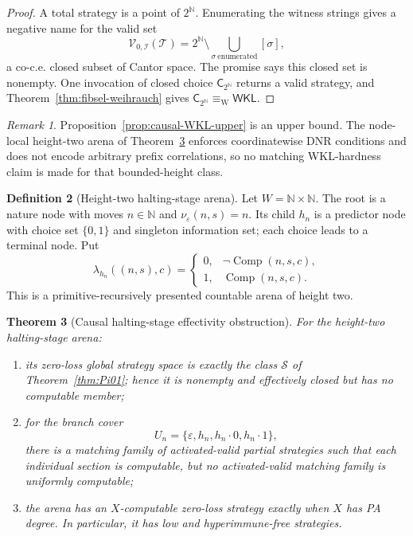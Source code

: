 \documentclass[11pt]{article}
\theoremstyle{plain}
\newtheorem{theorem}{Theorem}[section]
\theoremstyle{definition}
\newtheorem{definition}[theorem]{Definition}
\theoremstyle{remark}
\newtheorem{remark}[theorem]{Remark}
\newcommand{\N}{\mathbb{N}}
\begin{document}
\begin{proof}
A total strategy is a point of $2^\N$. Enumerating the witness strings gives a
negative name for the valid set
\[
\mathscr V_{0,\mathcal I}(\mathcal T)
=2^\N\setminus\bigcup_{\sigma\ \mathrm{enumerated}}[\sigma],
\]
a co-c.e. closed subset of Cantor space. The promise says this closed set is
nonempty. One invocation of closed choice $\mathsf C_{2^\N}$ returns a valid
strategy, and Theorem~\ref{thm:fibsel-weihrauch} gives
$\mathsf C_{2^\N}\equiv_{\mathrm W}\mathsf{WKL}$.
\end{proof}

\begin{remark}
Proposition~\ref{prop:causal-WKL-upper} is an upper bound. The node-local
height-two arena of Theorem~\ref{thm:K-arena} enforces coordinatewise DNR
conditions and does not encode arbitrary prefix correlations, so no matching
WKL-hardness claim is made for that bounded-height class.
\end{remark}

\begin{definition}[Height-two halting-stage arena]
\label{def:K-arena}
Let $W=\N\times\N$. The root is a nature node with moves $n\in\N$ and
$\nu_\varepsilon(n,s)=n$. Its child $h_n$ is a predictor node with choice set
$\{0,1\}$ and singleton information set; each choice leads to a terminal node.
Put
\[
\lambda_{h_n}((n,s),c)=
\begin{cases}
0,&\neg\operatorname{Comp}(n,s,c),\\
1,&\operatorname{Comp}(n,s,c).
\end{cases}
\]
This is a primitive-recursively presented countable arena of height two.
\end{definition}

\begin{theorem}[Causal halting-stage effectivity obstruction]
\label{thm:K-arena}
For the height-two halting-stage arena:
\begin{enumerate}[label=(\roman*)]
\item its zero-loss global strategy space is exactly the class $\mathcal S$ of
Theorem~\ref{thm:Pi01}; hence it is nonempty and effectively closed but has no
computable member;
\item for the branch cover
\[
U_n=\{\varepsilon,h_n,h_n\!\cdot0,h_n\!\cdot1\},
\]
there is a matching family of activated-valid partial strategies such that each
individual section is computable, but no activated-valid matching family is
uniformly computable;
\item the arena has an $X$-computable zero-loss strategy exactly when $X$ has
PA degree. In particular, it has low and hyperimmune-free strategies.
\end{enumerate}
\end{theorem}
\end{document}
